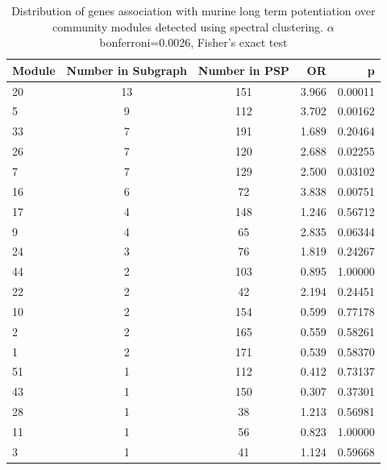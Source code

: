 \begin{table}[ht]
\centering
\begin{tabular}{lccrr}
  \hline
Module & Number in Subgraph & Number in PSP & OR & p \\ 
  \hline
20 & 13 & 151 & 3.966 & 0.00011 \\ 
  5 &  9 & 112 & 3.702 & 0.00162 \\ 
  33 &  7 & 191 & 1.689 & 0.20464 \\ 
  26 &  7 & 120 & 2.688 & 0.02255 \\ 
  7 &  7 & 129 & 2.500 & 0.03102 \\ 
  16 &  6 & 72 & 3.838 & 0.00751 \\ 
  17 &  4 & 148 & 1.246 & 0.56712 \\ 
  9 &  4 & 65 & 2.835 & 0.06344 \\ 
  24 &  3 & 76 & 1.819 & 0.24267 \\ 
  44 &  2 & 103 & 0.895 & 1.00000 \\ 
  22 &  2 & 42 & 2.194 & 0.24451 \\ 
  10 &  2 & 154 & 0.599 & 0.77178 \\ 
  2 &  2 & 165 & 0.559 & 0.58261 \\ 
  1 &  2 & 171 & 0.539 & 0.58370 \\ 
  51 &  1 & 112 & 0.412 & 0.73137 \\ 
  43 &  1 & 150 & 0.307 & 0.37301 \\ 
  28 &  1 & 38 & 1.213 & 0.56981 \\ 
  11 &  1 & 56 & 0.823 & 1.00000 \\ 
  3 &  1 & 41 & 1.124 & 0.59668 \\ 
   \hline
 
\end{tabular}
\caption{Distribution of genes association with murine long term potentiation over community modules detected using spectral clustering. $\alpha$ bonferroni=0.0026, Fisher's exact test}
\label{tab:Distribution of genes association with murine long term potentiation over community modules detected using spectral clustering}
\end{table}


